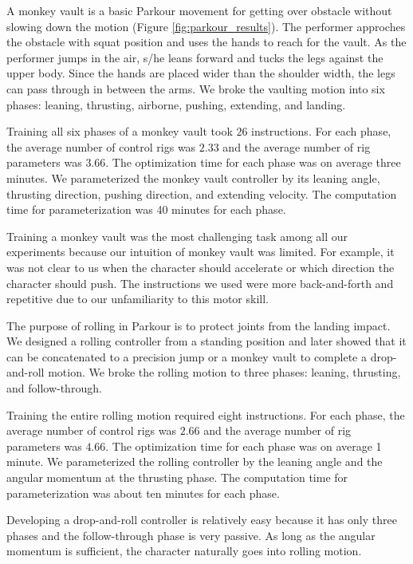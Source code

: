 A monkey vault is a basic Parkour movement for getting over obstacle
without slowing down the motion (Figure \ref{fig:parkour_results}).
The performer approches the obstacle
with squat position and uses the hands to reach for the vault. As the
performer jumps in the air, s/he leans forward and tucks the legs
against the upper body. Since the hands are placed wider than the
shoulder width, the legs can pass through in between the arms. We
broke the vaulting motion into six phases: leaning, thrusting,
airborne, pushing, extending, and landing.

Training all six phases of a monkey vault took $26$ instructions.  For
each phase, the average number of control rigs was $2.33$ and the
average number of rig parameters was $3.66$.  The optimization time
for each phase was on average three minutes. We parameterized the monkey
vault controller by its leaning angle, thrusting direction, pushing
direction, and extending velocity. The computation time for
parameterization was 40 minutes for each phase.

Training a monkey vault was the most challenging task among all our
experiments because our intuition of monkey vault was
limited. For example, it was not clear to us when the character should
accelerate or which direction the character should push. The
instructions we used were more back-and-forth and repetitive due to
our unfamiliarity to this motor skill.

The purpose of rolling in Parkour is to protect joints from
the landing impact. We designed a rolling controller from a standing
position and later showed that it can be concatenated to a precision
jump or a monkey vault to complete a drop-and-roll motion. We broke
the rolling motion to three phases: leaning, thrusting, and follow-through.

Training the entire rolling motion required eight instructions.  For each
phase, the average number of control rigs was $2.66$ and the average
number of rig parameters was $4.66$. The optimization time for each
phase was on average 1 minute. We parameterized the rolling controller
by the leaning angle and the angular momentum at the thrusting
phase. The computation time for parameterization was about ten
minutes for each phase.

Developing a drop-and-roll controller is relatively easy because it has
only three phases and the follow-through phase is very passive. As
long as the angular momentum is sufficient, the character naturally
goes into rolling motion.
 
